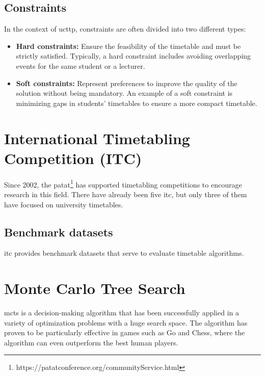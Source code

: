 \subsection{Constraints}
In the context of \ac{ucttp}, constraints are often divided into two different types:
\begin{itemize}
\item \textbf{Hard constraints:} Ensure the feasibility of the timetable and must be strictly satisfied. Typically, a hard constraint includes avoiding overlapping events for the same student or a lecturer. 
\item \textbf{Soft constraints:} Represent preferences to improve the quality of the solution without being mandatory. An example of a soft constraint is minimizing gaps in students' timetables to ensure a more compact timetable.
\end{itemize}

\section{International Timetabling Competition (ITC)}

Since 2002, the \ac{patat}\footnote{https://patatconference.org/communityService.html} has supported timetabling competitions to encourage research in this field. There have already been five \ac{itc}, but only three of them have focused on university timetables.

\subsection{Benchmark datasets}

\ac{itc} provides benchmark datasets that serve to evaluate timetable algorithms. %

\section{Monte Carlo Tree Search}

\ac{mcts} is a decision-making algorithm that has been successfully applied in a variety of optimization problems with a huge search space. The algorithm has proven to be particularly effective in games such as Go and Chess, where the algorithm can even outperform the best human players.

